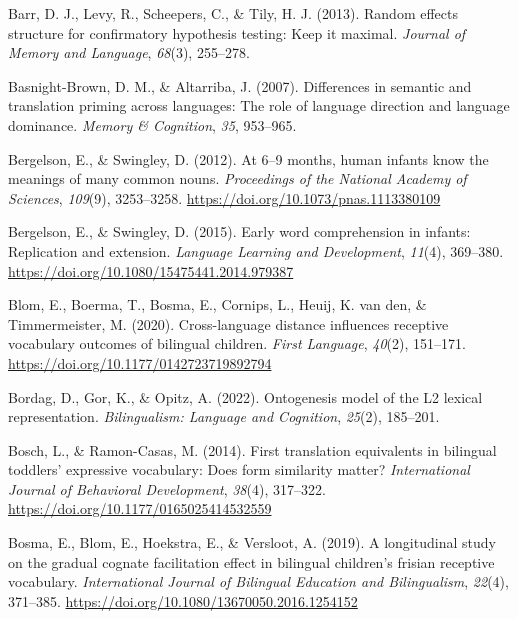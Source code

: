 \documentclass[
]{article}
\newlength{\cslhangindent}
\newlength{\cslentryspacingunit} %
\newenvironment{CSLReferences}[2] %
 {%
  \setlength{\parindent}{0pt}
  \ifodd #1
  \let\oldpar\par
  \def\par{\hangindent=\cslhangindent\oldpar}
  \fi
  \setlength{\parskip}{#2\cslentryspacingunit}
 }%
 {}
\begin{document}
\begin{CSLReferences}{1}{0}
\leavevmode{}%
Barr, D. J., Levy, R., Scheepers, C., \& Tily, H. J. (2013). Random
effects structure for confirmatory hypothesis testing: Keep it maximal.
\emph{Journal of Memory and Language}, \emph{68}(3), 255--278.

\leavevmode{}%
Basnight-Brown, D. M., \& Altarriba, J. (2007). Differences in semantic
and translation priming across languages: The role of language direction
and language dominance. \emph{Memory \& Cognition}, \emph{35}, 953--965.

\leavevmode{}%
Bergelson, E., \& Swingley, D. (2012). At 6--9 months, human infants
know the meanings of many common nouns. \emph{Proceedings of the
National Academy of Sciences}, \emph{109}(9), 3253--3258.
\url{https://doi.org/10.1073/pnas.1113380109}

\leavevmode{}%
Bergelson, E., \& Swingley, D. (2015). Early word comprehension in
infants: Replication and extension. \emph{Language Learning and
Development}, \emph{11}(4), 369--380.
\url{https://doi.org/10.1080/15475441.2014.979387}

\leavevmode{}%
Blom, E., Boerma, T., Bosma, E., Cornips, L., Heuij, K. van den, \&
Timmermeister, M. (2020). Cross-language distance influences receptive
vocabulary outcomes of bilingual children. \emph{First Language},
\emph{40}(2), 151--171. \url{https://doi.org/10.1177/0142723719892794}

\leavevmode{}%
Bordag, D., Gor, K., \& Opitz, A. (2022). Ontogenesis model of the L2
lexical representation. \emph{Bilingualism: Language and Cognition},
\emph{25}(2), 185--201.

\leavevmode{}%
Bosch, L., \& Ramon-Casas, M. (2014). First translation equivalents in
bilingual toddlers' expressive vocabulary: Does form similarity matter?
\emph{International Journal of Behavioral Development}, \emph{38}(4),
317--322. \url{https://doi.org/10.1177/0165025414532559}

\leavevmode{}%
Bosma, E., Blom, E., Hoekstra, E., \& Versloot, A. (2019). A
longitudinal study on the gradual cognate facilitation effect in
bilingual children's frisian receptive vocabulary. \emph{International
Journal of Bilingual Education and Bilingualism}, \emph{22}(4),
371--385. \url{https://doi.org/10.1080/13670050.2016.1254152}


\end{CSLReferences}
\end{document}
